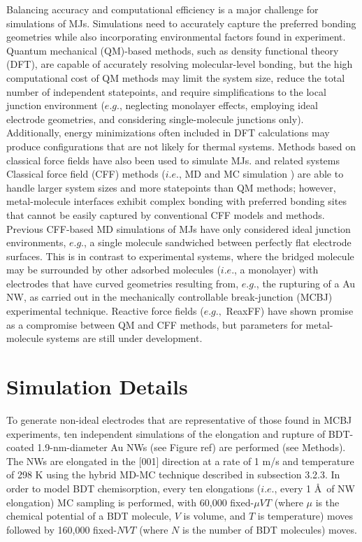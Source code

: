 \documentclass[10pt]{report}  %
\newcommand\findent{\hspace*{\parindent}}
\begin{document}
Balancing accuracy and computational efficiency is a major challenge for simulations of MJs.  Simulations need to accurately capture the preferred bonding geometries while also incorporating environmental factors found in experiment.  Quantum mechanical (QM)-based methods, such as density functional theory (DFT), are capable of accurately resolving molecular-level bonding, but the high computational cost of QM methods may limit the system size, reduce the total number of independent statepoints, and require simplifications to the local junction environment ($e.g.$, neglecting monolayer effects, employing ideal electrode geometries, and considering single-molecule junctions only). \cite{Paulsson:2009,Strange:2010,Sergueev:2010,Pontes:2011,Velez:2010,Sen:2010,Lin:2011}  Additionally, energy minimizations often included in DFT calculations \cite{Sergueev:2010,Pontes:2011} may produce configurations that are not likely for thermal systems.  Methods based on classical force fields have also been used to simulate MJs. \cite{Andrews:2008,Cao:2008,Maul:2009,Kim:2010} and related systems \cite{Pu:2008,Pu:2010,French:2011}  Classical force field (CFF) methods ($i.e.$, MD and MC simulation \cite{Frenkel:2002}) are able to handle larger system sizes and more statepoints than QM methods; however, metal-molecule interfaces exhibit complex bonding with preferred bonding sites that cannot be easily captured by conventional CFF models and methods.\cite{Leng:2007}  Previous CFF-based MD simulations of MJs have only considered ideal junction environments, $e.g.$, a single molecule sandwiched between perfectly flat electrode surfaces. \cite{Andrews:2008,Cao:2008,Kim:2010} This is in contrast to experimental systems, where the bridged molecule may be surrounded by other adsorbed molecules ($i.e.$, a monolayer) with electrodes that have curved geometries resulting from, $e.g.$, the rupturing of a Au NW, as carried out in the mechanically controllable break-junction (MCBJ) experimental technique.\cite{Reed:1997,Tsutsui:2006,Tsutsui:2009}  Reactive force fields ($e.g.,$ ReaxFF) have shown promise as a compromise between QM and CFF methods,\cite{Iacovella:2011} but parameters for metal-molecule systems are still under development.  

\section{Simulation Details}

\findent To generate non-ideal electrodes that are representative of those found in MCBJ experiments, ten independent simulations of the elongation and rupture of BDT-coated 1.9-nm-diameter Au NWs (see Figure ref\label{fig:jpcc-nws}) are performed (see Methods).  The NWs are elongated in the [001] direction at a rate of 1 m/s and temperature of 298 K using the hybrid MD-MC technique described in subsection 3.2.3. In order to model BDT chemisorption, every ten elongations ($i.e.$, every 1 \AA\ of NW elongation) MC sampling is performed, with 60,000 fixed-$\mu$$VT$ (where $\mu$ is the chemical potential of a BDT molecule, $V$ is volume, and $T$ is temperature) moves followed by 160,000 fixed-$NVT$ (where $N$ is the number of BDT molecules) moves.   
\end{document}
